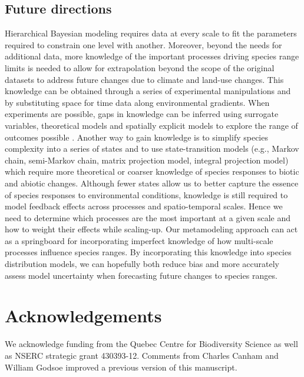 \documentclass[11pt]{article}
\begin{document}
\subsection*{Future directions}
Hierarchical Bayesian modeling requires data at every scale to fit the parameters required to constrain one level with another.
Moreover, beyond the needs for additional data, more knowledge of the important processes driving species range limits is needed to allow for extrapolation beyond the scope of the original datasets to address future changes due to climate and land-use changes.
This knowledge can be obtained through a series of experimental manipulations and by substituting space for time data along environmental gradients.
When experiments are possible, gaps in knowledge can be inferred using surrogate variables, theoretical models and spatially explicit models to explore the range of outcomes possible \citep{Fortin2012}. 
Another way to gain knowledge is to simplify species complexity into a series of states and to use state-transition models (e.g., Markov chain, semi-Markov chain, matrix projection model, integral projection model) which require more theoretical or coarser knowledge of species responses to biotic and abiotic changes.
Although fewer states allow us to better capture the essence of species responses to environmental conditions, knowledge is still required to model feedback effects across processes and spatio-temporal scales.
Hence we need to determine which processes are the most important at a given scale and how to weight their effects while scaling-up.
Our metamodeling approach can act as a springboard for incorporating imperfect knowledge of how multi-scale processes influence species ranges.
By incorporating this knowledge into species distribution models, we can hopefully both reduce bias and more accurately assess model uncertainty when forecasting future changes to species ranges.

\nolinenumbers
\section*{Acknowledgements}
We acknowledge funding from the Quebec Centre for Biodiversity Science as well as NSERC strategic grant 430393-12. Comments from Charles Canham and William Godsoe improved a previous version of this manuscript.


%
%
\end{document}
